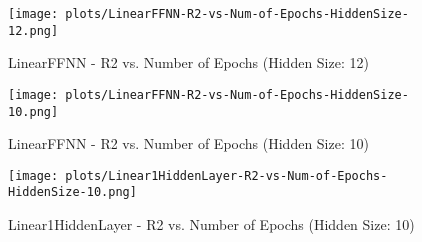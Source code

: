 \begin{figure}[H]
    \centering
    \texttt{[image: plots/LinearFFNN-R2-vs-Num-of-Epochs-HiddenSize-12.png]}
    \caption{LinearFFNN - R2 vs. Number of Epochs (Hidden Size: 12)}
\end{figure}

\begin{figure}[H]
    \centering
    \texttt{[image: plots/LinearFFNN-R2-vs-Num-of-Epochs-HiddenSize-10.png]}
    \caption{LinearFFNN - R2 vs. Number of Epochs (Hidden Size: 10)}
\end{figure}

\begin{figure}[H]
    \centering
    \texttt{[image: plots/Linear1HiddenLayer-R2-vs-Num-of-Epochs-HiddenSize-10.png]}
    \caption{Linear1HiddenLayer - R2 vs. Number of Epochs (Hidden Size: 10)}
\end{figure}
